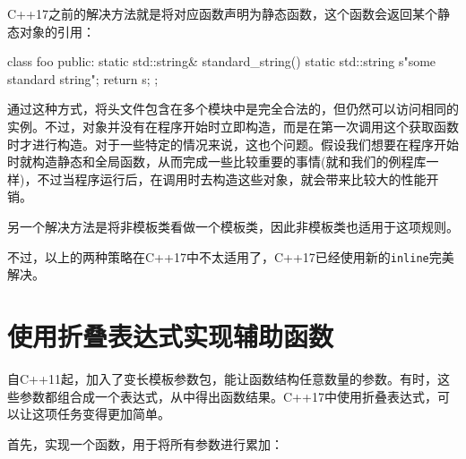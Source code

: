
C++17之前的解决方法就是将对应函数声明为静态函数，这个函数会返回某个静态对象的引用：

\begin{codebox}[cpp]
class foo{
public:
    static std::string& standard_string(){
        static std::string s{"some standard string"};
        return s;
    }    
};
\end{codebox}

通过这种方式，将头文件包含在多个模块中是完全合法的，但仍然可以访问相同的实例。不过，对象并没有在程序开始时立即构造，而是在第一次调用这个获取函数时才进行构造。对于一些特定的情况来说，这也个问题。假设我们想要在程序开始时就构造静态和全局函数，从而完成一些比较重要的事情(就和我们的例程库一样)，不过当程序运行后，在调用时去构造这些对象，就会带来比较大的性能开销。

另一个解决方法是将非模板类看做一个模板类，因此非模板类也适用于这项规则。

不过，以上的两种策略在C++17中不太适用了，C++17已经使用新的\texttt{inline}完美解决。


\section{使用折叠表达式实现辅助函数}

自C++11起，加入了变长模板参数包，能让函数结构任意数量的参数。有时，这些参数都组合成一个表达式，从中得出函数结果。C++17中使用折叠表达式，可以让这项任务变得更加简单。


首先，实现一个函数，用于将所有参数进行累加：

